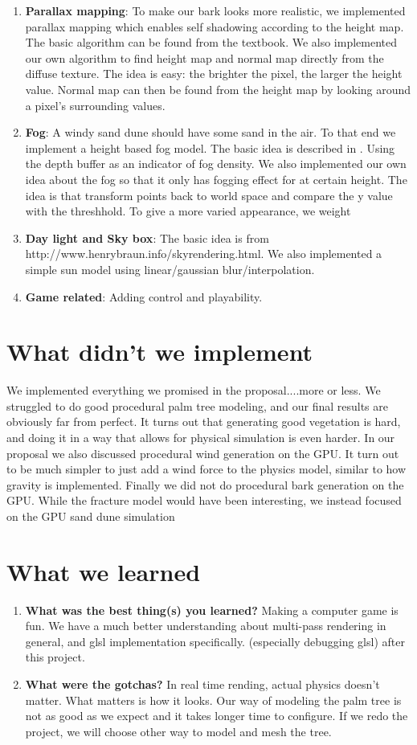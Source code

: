 \documentclass[annual]{acmsiggraph}
\begin{document}
\begin{enumerate}
\item{\textbf{Parallax mapping}: To make our bark looks more realistic, we implemented parallax mapping which enables self shadowing according to the height map. The basic algorithm can be found from the textbook. We also implemented our own algorithm to find height map and normal map directly from the diffuse texture. The idea is easy: the brighter the pixel, the larger the height value. Normal map can then be found from the height map by looking around a pixel's surrounding values.}
\item{\textbf{Fog}: A windy sand dune should have some sand in the air. To that end we implement a height based fog model. The basic idea is described in \cite{hoffman2008}. Using the depth buffer as an indicator of fog density. We also implemented our own idea about the fog so that it only has fogging effect for at certain height. The idea is that transform points back to world space and compare the y value with the threshhold.  To give a more varied appearance,  we weight }
\item{\textbf{Day light and Sky box}: The basic idea is from http://www.henrybraun.info/skyrendering.html. We also implemented a simple sun model using linear/gaussian blur/interpolation.}
\item{\textbf{Game related}: Adding control and playability. }
\end{enumerate}

\section{What didn't we implement}
We implemented everything we promised in the proposal....more or less.   We struggled to do good procedural palm tree modeling, and our final results are obviously far from perfect.    It turns out that generating good vegetation is hard, and doing it in a way that allows for physical simulation is even harder.  In our proposal we also discussed procedural wind generation on the GPU.  It turn out to be much simpler to just add a wind force to the physics model,  similar to how gravity is implemented.  Finally we did not do procedural bark generation on the GPU.  While the fracture model would have been interesting, we instead focused on the GPU sand dune simulation  


\section{What we learned}
\begin{enumerate}
\item{\textbf{What was the best thing(s) you learned?} Making a computer game is fun. We have a much better understanding about multi-pass rendering in general, and glsl implementation specifically.   (especially debugging glsl) after this project.}
\item{\textbf{What were the gotchas?} In real time rending, actual physics doesn't matter. What matters is how it looks. Our way of modeling the palm tree is not as good as we expect and it takes longer time to configure. If we redo the project, we will choose other way to model and mesh the tree.}
\end{enumerate}
\end{document}
